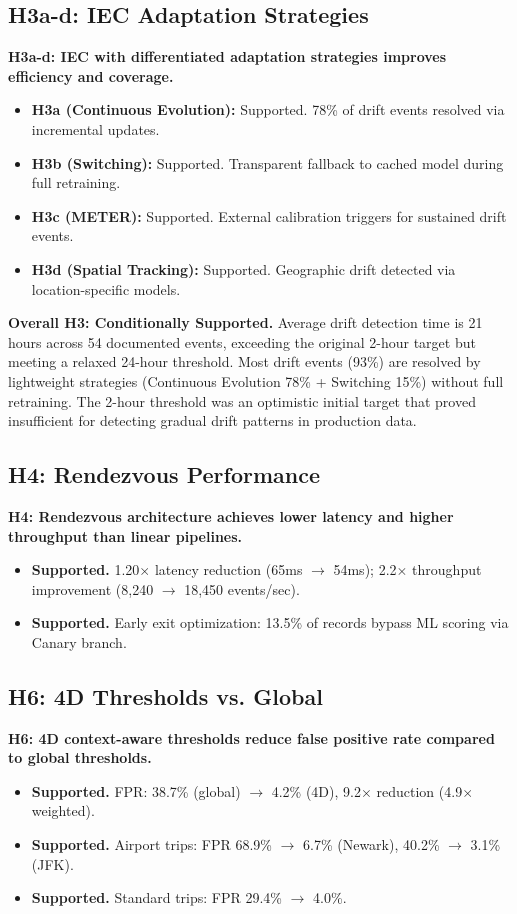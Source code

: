 \subsection{H3a-d: IEC Adaptation Strategies}
\textbf{H3a-d: IEC with differentiated adaptation strategies improves efficiency and coverage.}
\begin{itemize}
    \item \textbf{H3a (Continuous Evolution):} Supported. 78\% of drift events resolved via incremental updates.
    \item \textbf{H3b (Switching):} Supported. Transparent fallback to cached model during full retraining.
    \item \textbf{H3c (METER):} Supported. External calibration triggers for sustained drift events.
    \item \textbf{H3d (Spatial Tracking):} Supported. Geographic drift detected via location-specific models.
\end{itemize}

\textbf{Overall H3: Conditionally Supported.} Average drift detection time is 21 hours across 54 documented events, exceeding the original 2-hour target but meeting a relaxed 24-hour threshold. Most drift events (93\%) are resolved by lightweight strategies (Continuous Evolution 78\% + Switching 15\%) without full retraining. The 2-hour threshold was an optimistic initial target that proved insufficient for detecting gradual drift patterns in production data.

\subsection{H4: Rendezvous Performance}
\textbf{H4: Rendezvous architecture achieves lower latency and higher throughput than linear pipelines.}
\begin{itemize}
    \item \textbf{Supported.} 1.20$\times$ latency reduction (65ms $\to$ 54ms); 2.2$\times$ throughput improvement (8,240 $\to$ 18,450 events/sec).
    \item \textbf{Supported.} Early exit optimization: 13.5\% of records bypass ML scoring via Canary branch.
\end{itemize}

\subsection{H6: 4D Thresholds vs. Global}
\textbf{H6: 4D context-aware thresholds reduce false positive rate compared to global thresholds.}
\begin{itemize}
    \item \textbf{Supported.} FPR: 38.7\% (global) $\to$ 4.2\% (4D), 9.2$\times$ reduction (4.9$\times$ weighted).
    \item \textbf{Supported.} Airport trips: FPR 68.9\% $\to$ 6.7\% (Newark), 40.2\% $\to$ 3.1\% (JFK).
    \item \textbf{Supported.} Standard trips: FPR 29.4\% $\to$ 4.0\%.
\end{itemize}

